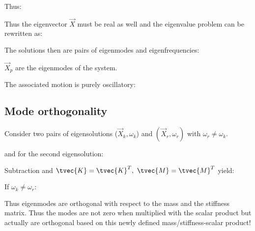 \documentclass[10pt,a4paper]{scrartcl}
\begin{document}
\begin{multicols*}{2}
Thus:


Thus the eigenvector $\vec{X}$ must be real as well and the eigenvalue problem can be rewritten as:


The solutions then are pairs of eigenmodes and eigenfrequencies:


$\vec{X}_p$ are the eigenmodes of the system.

The associated motion is purely oscillatory:



\subsection{Mode orthogonality}

Consider two pairs of eigensolutions ($\vec{X}_k,\omega_k$) and $(\vec{X}_r,\omega_r)$ with $\omega_r\neq\omega_k$.


and for the second eigensolution:


Subtraction and $\tvec{K}=\tvec{K}^T,\ \tvec{M}=\tvec{M}^T$ yield:


If $\omega_k\neq\omega_r$:


Thus eigenmodes are orthogonal with respect to the mass and the stiffness matrix. Thus the modes are not zero when multiplied with the scalar product but actually are orthogonal based on this newly defined mass/stiffness-scalar product!




\end{multicols*}
\end{document}
